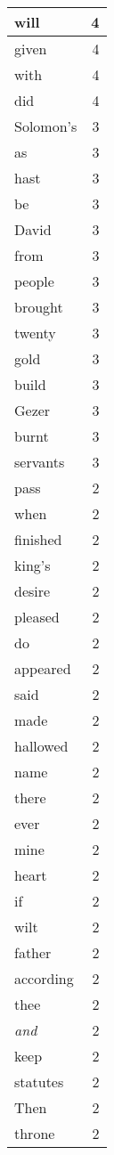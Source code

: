 \begin{center}
\begin{longtable}{l|r}
will & 4 \\ \hline
given & 4 \\ \hline
with & 4 \\ \hline
did & 4 \\ \hline
Solomon's & 3 \\ \hline
as & 3 \\ \hline
hast & 3 \\ \hline
be & 3 \\ \hline
David & 3 \\ \hline
from & 3 \\ \hline
people & 3 \\ \hline
brought & 3 \\ \hline
twenty & 3 \\ \hline
gold & 3 \\ \hline
build & 3 \\ \hline
Gezer & 3 \\ \hline
burnt & 3 \\ \hline
servants & 3 \\ \hline
pass & 2 \\ \hline
when & 2 \\ \hline
finished & 2 \\ \hline
king's & 2 \\ \hline
desire & 2 \\ \hline
pleased & 2 \\ \hline
do & 2 \\ \hline
appeared & 2 \\ \hline
said & 2 \\ \hline
made & 2 \\ \hline
hallowed & 2 \\ \hline
name & 2 \\ \hline
there & 2 \\ \hline
ever & 2 \\ \hline
mine & 2 \\ \hline
heart & 2 \\ \hline
if & 2 \\ \hline
wilt & 2 \\ \hline
father & 2 \\ \hline
according & 2 \\ \hline
thee & 2 \\ \hline
\emph{and} & 2 \\ \hline
keep & 2 \\ \hline
statutes & 2 \\ \hline
Then & 2 \\ \hline
throne & 2 \\ \hline

\end{longtable}
\end{center}
